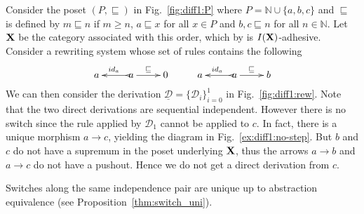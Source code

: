 \documentclass[a4paper,UKenglish,cleveref,pdftex,thm-restate,numberwithinsect]{lipics-v2021}
\newcommand{\id}[1]{\mathsf{id}_{#1}}
\def\X{\textbf {\textup{X}}}
\newcommand{\dder}[1]{\mathscr{#1}}
\newcommand{\der}[1]{\underline{\dder{#1}}}
\begin{document}
\begin{example}
  \label{ex:diff1}
  Consider the poset $(P, \sqsubseteq)$ in Fig.~\ref{fig:diff1:P} where
  $P = \mathbb{N} \cup \{a,b,c\}$ and $\sqsubseteq$ is defined by
  $m \sqsubseteq n$ if $m \geq n$, $a \sqsubseteq x$ for all $x \in P$
  and $b, c \sqsubseteq n$ for all $n \in \mathbb{N}$.
  Let $\X$ be the  
  category associated with this order, which by  is
  $\mathsf{I(\X)}$-adhesive. 
  Consider a rewriting
  system whose set of rules contains the following 
  \[\xymatrix{a & a \ar[r]^{\sqsubseteq} \ar@{>->}[l]_{\id{a}} & 0 & a & a
      \ar[r]^{\sqsubseteq} \ar@{>->}[l]_{\id{a}} & b }\]
  We can then consider the  derivation
  $\der{D}=\{\dder{D}_i\}_{i=0}^1$ in Fig.~\ref{fig:diff1:rew}.
  Note that the two direct derivations are sequential
  independent. However there is no switch since the rule applied by
  $\dder{D}_1$ cannot be applied to $c$. In fact, there is a unique morphism
  $a\to c$, yielding the diagram in Fig.~\ref{ex:diff1:no-step}. But $b$ and $c$
  do not have a supremum in the poset underlying $\X$, thus the arrows
  $a\to b$ and $a\to c$ do not have a
  pushout. Hence we do not get a direct derivation from $c$.
\end{example}

\iffalse 

Switches along the same independence pair are unique up to abstraction
equivalence (see Proposition~\ref{thm:switch_uni}).
\end{document}
